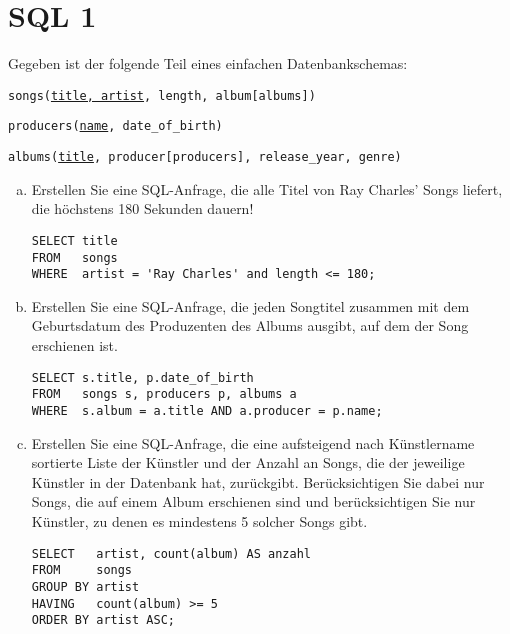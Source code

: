 \section{SQL 1}
Gegeben ist der folgende Teil eines einfachen Datenbankschemas:

\texttt{songs(\underline{title, artist}, length, album[albums])}

\texttt{producers(\underline{name}, date\_of\_birth)}

\texttt{albums(\underline{title}, producer[producers], release\_year, genre)}

\begin{enumerate}[a)]
	\item Erstellen Sie eine SQL-Anfrage, die alle Titel von Ray Charles' Songs liefert, die höchstens 180 Sekunden dauern!

\cprotEnv
	\begin{solution}
	\begin{lstlisting}
SELECT title
FROM   songs
WHERE  artist = 'Ray Charles' and length <= 180;
	\end{lstlisting}
	\end{solution}


	\item Erstellen Sie eine SQL-Anfrage, die jeden Songtitel zusammen mit dem Geburtsdatum des Produzenten des Albums ausgibt, auf dem der Song erschienen ist.

\cprotEnv
	\begin{solution}
	\begin{lstlisting}
SELECT s.title, p.date_of_birth
FROM   songs s, producers p, albums a
WHERE  s.album = a.title AND a.producer = p.name;
	\end{lstlisting}
	\end{solution}


	\item Erstellen Sie eine SQL-Anfrage, die eine aufsteigend nach Künstlername sortierte Liste der Künstler und der Anzahl an Songs, die der jeweilige Künstler in der Datenbank hat, zurückgibt.
	Berücksichtigen Sie dabei nur Songs, die auf einem Album erschienen sind und berücksichtigen Sie nur Künstler, zu denen es mindestens 5 solcher Songs gibt.

\cprotEnv
	\begin{solution}
	\begin{lstlisting}
SELECT   artist, count(album) AS anzahl
FROM     songs
GROUP BY artist
HAVING   count(album) >= 5
ORDER BY artist ASC;
	\end{lstlisting}


\end{solution}
\end{enumerate}
